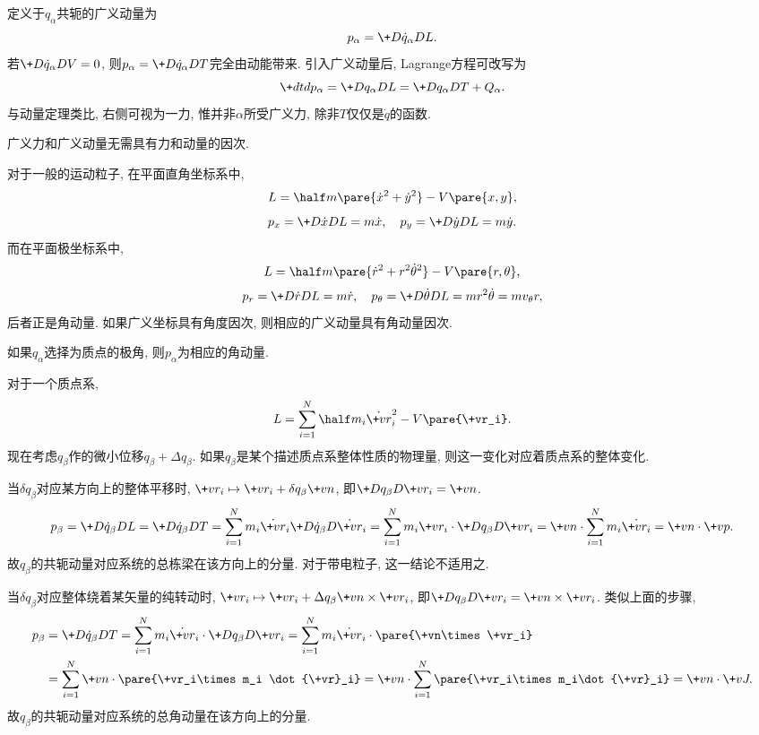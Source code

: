 \documentclass{ctexart}
\begin{document}
定义于$q_\alpha$共轭的广义动量为
\[ p_\alpha = \+D{\dot{q}_\alpha}DL. \]
若$\displaystyle \+D{\dot{q}_\alpha}DV = 0$, 则$\displaystyle p_\alpha = \+D{\dot{q}_\alpha}DT$完全由动能带来. 引入广义动量后, Lagrange方程可改写为
\[ \+dtd{p_\alpha} = \+D{q_\alpha}DL = \+D{q_\alpha}DT + Q_\alpha. \]
与动量定理类比, 右侧可视为一力, 惟并非$\alpha$所受广义力, 除非$T$仅仅是$\dot{q}$的函数.
\begin{pitfall}
    广义力和广义动量无需具有力和动量的因次.
\end{pitfall}
\begin{sample}
    \begin{ex}
        对于一般的运动粒子, 在平面直角坐标系中,
        \[ L = \half m\pare{\dot{x}^2 + \dot{y}^2} - V\pare{x,y}, \]
        \[ p_x = \+D{\dot{x}}DL = m\dot{x},\quad p_y = \+D{\dot{y}}DL = m\dot{y}. \]
        而在平面极坐标系中,
        \[ L = \half m\pare{\dot{r}^2 + r^2\dot{\theta}^2} - V\pare{r,\theta}, \]
        \[ p_r = \+D{\dot{r}}DL = m\dot{r},\quad p_\theta = \+D{\dot{\theta}}DL = mr^2\dot{\theta} = mv_{\theta}r, \]
        后者正是角动量. 如果广义坐标具有角度因次, 则相应的广义动量具有角动量因次.
    \end{ex}
\end{sample}
\begin{lemma}
    如果$q_\alpha$选择为质点的极角, 则$p_\alpha$为相应的角动量.
\end{lemma}
对于一个质点系,
\[ L = \sum_{i=1}^N \half m_i \dot{\+vr}_i^2 - V\pare{\+vr_i}. \]
现在考虑$q_\beta$作的微小位移$q_\beta+\Delta q_\beta$. 如果$q_\beta$是某个描述质点系整体性质的物理量, 则这一变化对应着质点系的整体变化.
\begin{cenum}
    \item 当$\delta q_\beta$对应某方向上的整体平移时, $\+vr_i \mapsto \+vr_i + \delta q_\beta \+vn$, 即$\displaystyle \+D{q_\beta}D{\+vr_i} = \+vn$.
    \[ p_\beta = \+D{\dot{q}_\beta}DL = \+D{\dot{q}_\beta}DT = \sum_{i=1}^N m_i\dot{\+vr}_i\+D{\dot{q}_\beta}D{\dot{\+vr}_i} = \sum_{i=1}^N m_i\+vr_i\cdot\+D{q_\beta}D{\+vr_i} = \+vn\cdot\sum_{i=1}^N m_i \dot{\+vr_i} = \+vn\cdot \+vp. \]
    故$q_\beta$的共轭动量对应系统的总栋梁在该方向上的分量. 对于带电粒子, 这一结论不适用之.
    \item 当$\delta q_\beta$对应整体绕着某矢量的纯转动时, $\+vr_i \mapsto \+vr_i + \Delta q_\beta \+vn\times\+vr_i$, 即$\displaystyle \+D{q_\beta}D{\+vr_i} = \+vn\times\+vr_i$. 类似上面的步骤,
    \begin{align*}
         p_\beta &= \+D{\dot{q}_\beta}D{T} = \sum_{i=1}^N m_i\dot{\+vr}_i\cdot\+D{q_\beta}D{\+vr_i} = \sum_{i=1}^N m_i \dot{\+vr}_i\cdot\pare{\+vn\times\+vr_i} \\
         &= \sum_{i=1}^N \+vn\cdot\pare{\+vr_i\times m_i \dot{\+vr}_i} = \+vn\cdot\sum_{i=1}^N\pare{\+vr_i\times m_i\dot{\+vr}_i} = \+vn\cdot\+vJ.
    \end{align*}
    故$q_\beta$的共轭动量对应系统的总角动量在该方向上的分量.
\end{cenum}
\end{document}
